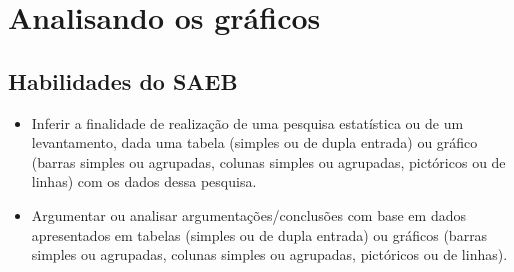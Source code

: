 \chapter{Analisando os gráficos}

\section{Habilidades do SAEB}

\begin{itemize}
\item Inferir a finalidade de realização de uma pesquisa estatística ou de
um levantamento, dada uma tabela (simples ou de dupla entrada) ou
gráfico (barras simples ou agrupadas, colunas simples ou agrupadas,
pictóricos ou de linhas) com os dados dessa pesquisa.

\item Argumentar ou analisar argumentações/conclusões com base em dados
apresentados em tabelas (simples ou de dupla entrada) ou gráficos
(barras simples ou agrupadas, colunas simples ou agrupadas, pictóricos
ou de linhas).
\end{itemize}


